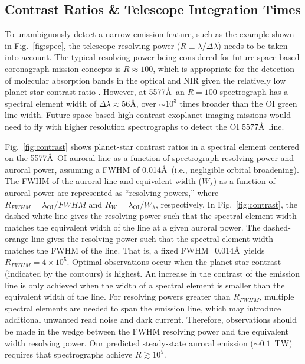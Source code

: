 \documentclass{emulateapj}
\begin{document}
\subsection{Contrast Ratios \& Telescope Integration Times}
\label{sec:int_times}

To unambiguously detect a narrow emission feature, such as the example shown in Fig.\ \ref{fig:spec}, the telescope resolving power ($R \equiv \lambda / \Delta \lambda$) needs to be taken into account. The typical resolving power being considered for future space-based coronagraph mission concepts is $R \approx 100$, which is appropriate for the detection of molecular absorption bands in the optical and NIR given the relatively low planet-star contrast ratio \citep{Robinson2016}. However, at 5577\AA\ an $R=100$ spectrograph has a spectral element width of $\Delta \lambda \approx 56$\AA, over ${\sim} 10^3$ times broader than the OI green line width. Future space-based high-contrast exoplanet imaging missions would need to fly with higher resolution spectrographs to detect the OI $5577$\AA\ line.

Fig.~\ref{fig:contrast} shows planet-star contrast ratios in a spectral element centered on the 5577\AA\ OI auroral line as a function of spectrograph resolving power and auroral power, assuming a FWHM of 0.014\AA\ (i.e., negligible orbital broadening). The FWHM of the auroral line and equivalent width ($W_{\lambda}$) as a function of auroral power are represented as ``resolving powers,'' where $R_{FWHM} = \lambda_{\text{OI}} / FWHM$ and $R_{W} = \lambda_{\text{OI}} / W_{\lambda}$, respectively. In Fig.~\ref{fig:contrast}, the dashed-white line gives the resolving power such that the spectral element width matches the equivalent width of the line at a given auroral power.  The dashed-orange line gives the resolving power such that the spectral element width matches the FWHM of the line. That is, a fixed FWHM=0.014\AA\ yields $R_{FWHM} = 4 \times 10^5$. Optimal observations occur when the planet-star contrast (indicated by the contours) is highest. An increase in the contrast of the emission line is only achieved when the width of a spectral element is smaller than the equivalent width of the line. For resolving powers greater than $R_{FWHM}$, multiple spectral elements are needed to span the emission line, which may introduce additional unwanted read noise and dark current. Therefore, observations should be made in the wedge between the FWHM resolving power and the equivalent width resolving power.  Our predicted steady-state auroral emission (${\sim}0.1$~TW) requires that spectrographs achieve $R \gtrsim 10^5$.
\end{document}
